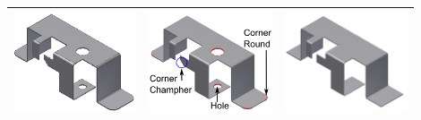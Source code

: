 \begin{minipage}[t]{\linewidth}
\begin{tabular}[h]{@{} p{0.3\linewidth} | p{0.3\linewidth} |  p{0.3\linewidth}@{}}
\includegraphics[width=0.98\linewidth]{images/DefeatPhase_I_3} &
\includegraphics[width=0.92\linewidth]{images/DefeatPhase_II_2_new_wlables.pdf} &
\includegraphics[width=0.98\linewidth]{images/DefeatPhase_II_3} \\ \bottomrule


\end{tabular}
\end{minipage}
